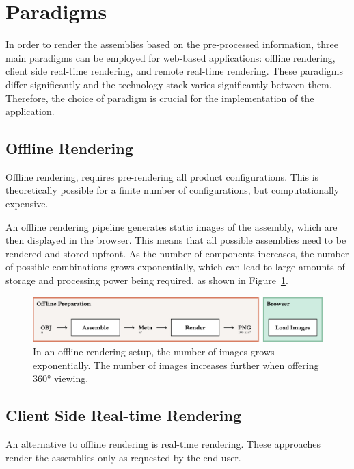 \section{Paradigms}

In order to render the assemblies based on the pre-processed information, three main paradigms can be employed for web-based applications: offline rendering, client side real-time rendering, and remote real-time rendering. These paradigms differ significantly and the technology stack varies significantly between them. Therefore, the choice of paradigm is crucial for the implementation of the application.

\subsection*{Offline Rendering}

Offline rendering, requires pre-rendering all product configurations. This is theoretically possible for a finite number of configurations, but computationally expensive. 

An offline rendering pipeline generates static images of the assembly, which are then displayed in the browser. This means that all possible assemblies need to be rendered and stored upfront. As the number of components increases, the number of possible combinations grows exponentially, which can lead to large amounts of storage and processing power being required, as shown in Figure~\ref{fig:cad-offline}.

\begin{figure}[H]
  \includegraphics[width=\columnwidth]{resources/cad-pipeline-offline.png}
  \caption{In an offline rendering setup, the number of images grows exponentially. The number of images increases further when offering 360° viewing.}
  \label{fig:cad-offline}
\end{figure}

\subsection*{Client Side Real-time Rendering}

An alternative to offline rendering is real-time rendering. These approaches render the assemblies only as requested by the end user.

